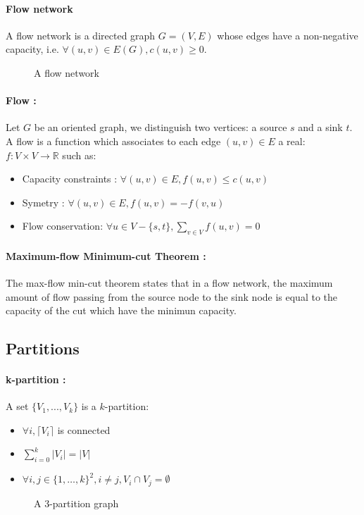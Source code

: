 \paragraph{Flow network}
A flow network is a directed graph $G=(V,E)$ whose edges have a non-negative
capacity, i.e. $\forall (u,v) \in E(G), c(u,v) \geq 0$.

\begin{figure}[!h]
  \begin{center}
    
  \end{center}
  \caption{A flow network}
\end{figure}

\paragraph{Flow :}
Let $G$ be an oriented graph, we distinguish two vertices: a source $s$ and a
sink $t$.
A flow is a function which associates to each edge $(u,v) \in E$ a real:
$f: V \times V \rightarrow \mathbb{R}$ such as:
\begin{itemize}
    \item Capacity constraints : $\forall (u,v) \in E, f(u,v) \leq c(u,v)$
    \item Symetry : $\forall (u,v) \in E, f(u,v) = - f(v,u) $
    \item Flow conservation: $\forall u \in V - \{s,t\}, \sum_{v \in V}f(u,v) = 0$ 
\end{itemize}


\paragraph{Maximum-flow Minimum-cut Theorem :}
The max-flow min-cut theorem states that in a flow network, the maximum amount
of flow passing from the source node to the sink node is equal to the capacity
of the cut which have the minimun capacity.

\subsection{Partitions}
\paragraph{k-partition :}
A set $\{V_1,...,V_k\}$ is a $k$-partition:
\begin{itemize}
    \item $\forall i, \lceil V_i \rceil$ is connected
    \item $\sum\limits_{i=0}^k|V_i| = |V|$
    \item $\forall i,j \in \{1, \dots, k\}^2, i \neq j, V_i \cap V_j = \emptyset$
\end{itemize}

\begin{figure}[!h]
    \begin{center}
        
    \end{center}
    \caption{A 3-partition graph}
\end{figure}


